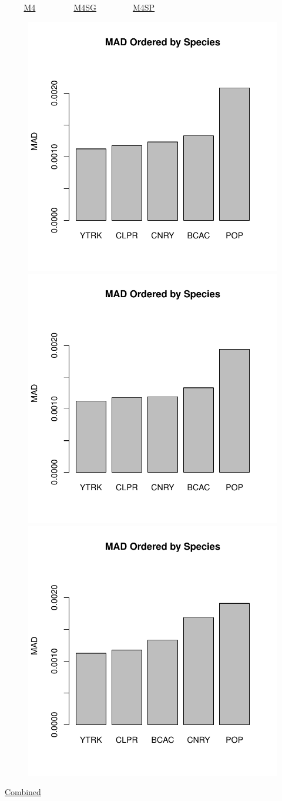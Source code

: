 \documentclass[ xcolor = pdftex, dvipsnames, table ]{beamer}
\begin{document}
%
\begin{frame}{$~~~~~~~~~$ \href{https://github.com/gasduster99/sppComp/tree/master/sscRuns/26919781982M4}{M4} $~~~~~~~~~~~~~~~~~~$ \href{https://github.com/gasduster99/sppComp/tree/master/sscRuns/26919781982M4IGSG}{M4SG} $~~~~~~~~~~~~~~~~~$ \href{https://github.com/gasduster99/sppComp/tree/master/sscRuns/26919781982M4IGSP}{M4SP} }
        \begin{figure}[ht!]
        \centering
        \hspace*{-1cm}
        \includegraphics[width=.4\textwidth]{../sscRuns/26919781982M4/sppHeadMad68.pdf}
        \includegraphics[width=.4\textwidth]{../sscRuns/26919781982M4IGSG/sppHeadMad68.pdf}
        \includegraphics[width=.4\textwidth]{../sscRuns/26919781982M4IGSP/sppHeadMad68.pdf}
        \end{figure}
	\vspace{-1cm}
	\begin{center}
	\Large
	\href{https://github.com/gasduster99/sppComp/tree/master/try1/postSSC/26919781982M4IGSPSG}{Combined}
	\end{center}
\end{frame}
\end{document}
